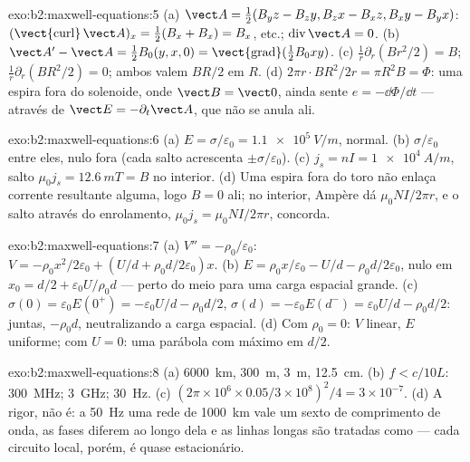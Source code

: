 \begin{solution}{exo:b2:maxwell-equations:5}
(a) $\vect A = \tfrac12(B_yz - B_zy, B_zx - B_xz, B_xy - B_yx)$: $(\operatorname{\vect{curl}}
\vect A)_x = \tfrac12(B_x + B_x) = B_x$, etc.; $\operatorname{div}\vect A = 0$. (b)
$\vect A' - \vect A = \tfrac12B_0(y, x, 0) = \operatorname{\vect{grad}}(\tfrac12B_0xy)$. (c)
$\frac1r\partial_r(Br^2/2) = B$; $\frac1r\partial_r(BR^2/2) = 0$; ambos valem $BR/2$ em
$R$. (d) $2\pi r\cdot BR^2/2r = \pi R^2B = \Phi$: uma espira fora do solenoide,
onde $\vect B = \vect 0$, ainda sente $e = -\dd\Phi/\dd t$ --- através de $\vect E =
-\partial_t\vect A$, que não se anula ali.
\end{solution}

\begin{solution}{exo:b2:maxwell-equations:6}
(a) $E = \sigma/\varepsilon_0 = \qty{1.1e5}{V/m}$, normal. (b) $\sigma/\varepsilon_0$ entre eles, nulo
fora (cada salto acrescenta $\pm\sigma/\varepsilon_0$). (c) $j_s = nI = \qty{1e4}{A/m}$, salto
$\mu_0j_s = \qty{12.6}{mT} = B$ no interior. (d) Uma espira fora do toro não enlaça
corrente resultante alguma, logo $B = 0$ ali; no interior, Ampère dá $\mu_0NI/2\pi r$,
e o salto através do enrolamento, $\mu_0j_s = \mu_0NI/2\pi r$, concorda.
\end{solution}

\begin{solution}{exo:b2:maxwell-equations:7}
(a) $V'' = -\rho_0/\varepsilon_0$: $V = -\rho_0x^2/2\varepsilon_0 + (U/d + \rho_0d/2\varepsilon_0)x$. (b)
$E = \rho_0x/\varepsilon_0 - U/d - \rho_0d/2\varepsilon_0$, nulo em $x_0 = d/2 + \varepsilon_0U/\rho_0d$
--- perto do meio para uma carga espacial grande. (c) $\sigma(0) = \varepsilon_0E(0^+) =
-\varepsilon_0U/d - \rho_0d/2$, $\sigma(d) = -\varepsilon_0E(d^-) = \varepsilon_0U/d - \rho_0d/2$: juntas,
$-\rho_0d$, neutralizando a carga espacial. (d) Com $\rho_0 = 0$: $V$ linear, $E$
uniforme; com $U = 0$: uma parábola com máximo em $d/2$.
\end{solution}

\begin{solution}{exo:b2:maxwell-equations:8}
(a) \qty{6000}{km}, \qty{300}{m}, \qty{3}{m}, \qty{12.5}{cm}. (b) $f < c/10L$:
\qty{300}{MHz}; \qty{3}{GHz}; \qty{30}{Hz}. (c) $(2\pi \times 10^6 \times 0.05/3 \times 10^8)^2/4 =
3 \times 10^{-7}$. (d) A rigor, não é: a \qty{50}{Hz} uma rede de \qty{1000}{km} vale um
sexto de comprimento de onda, as fases diferem ao longo dela e as linhas longas são
tratadas como  --- cada circuito local, porém, é
quase estacionário.
\end{solution}

